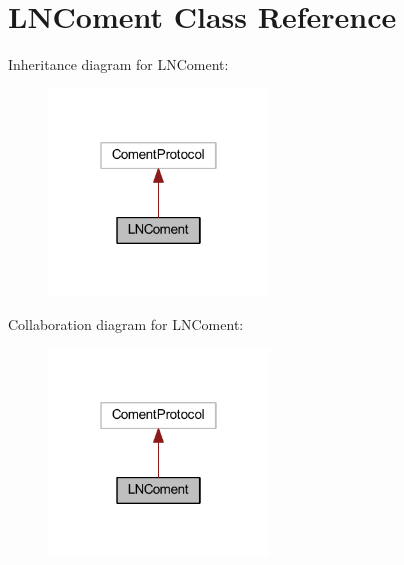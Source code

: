 \hypertarget{class_l_n_coment}{\section{L\-N\-Coment Class Reference}
\label{class_l_n_coment}
}


Inheritance diagram for L\-N\-Coment\-:
\nopagebreak
\begin{figure}[H]
\begin{center}
\leavevmode
\includegraphics[width=166pt]{class_l_n_coment__inherit__graph}
\end{center}
\end{figure}


Collaboration diagram for L\-N\-Coment\-:
\nopagebreak
\begin{figure}[H]
\begin{center}
\leavevmode
\includegraphics[width=166pt]{class_l_n_coment__coll__graph}
\end{center}
\end{figure}
